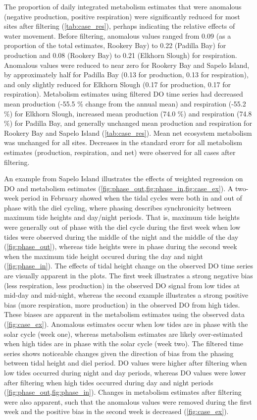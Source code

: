 \documentclass[letterpaper,12pt,oneside]{article}\usepackage[]{graphicx}\usepackage[]{color}
\begin{document}
The proportion of daily integrated metabolism estimates that were anomalous (negative production, positive respiration) were significantly reduced for most sites after filtering (\cref{tab:case_res}), perhaps indicating the relative effects of water movement.  Before filtering, anomalous values ranged from 0.09 (as a proportion of the total estimates, Rookery Bay) to 0.22 (Padilla Bay) for production and 0.08 (Rookery Bay) to 0.21 (Elkhorn Slough) for respiration. Anomalous values were reduced to near zero for Rookery Bay and Sapelo Island, by approximately half for Padilla Bay (0.13 for production, 0.13 for respiration), and only slightly reduced for Elkhorn Slough (0.17 for production, 0.17 for respiration).  Metabolism estimates using filtered \ac{DO} time series had decreased mean production (-55.5 \% change from the annual mean) and respiration (-55.2 \%) for Elkhorn Slough, increased mean production (74.0 \%) and respiration (74.8 \%) for Padilla Bay, and generally unchanged mean production and respiration for Rookery Bay and Sapelo Island (\cref{tab:case_res}).  Mean net ecosystem metabolism was unchanged for all sites.  Decreases in the standard erorr for all metabolism estimates (production, respiration, and net) were observed for all cases after filtering.  

An example from Sapelo Island illustrates the effects of weighted regression on \ac{DO} and metabolism estimates (\cref{fig:phase_out,fig:phase_in,fig:case_ex}).   A two-week period in February showed when the tidal cycles were both in and out of phase with the diel cycling, where phasing describes synchronicity between maximum tide heights and day/night periods.  That is, maximum tide heights were generally out of phase with the diel cycle during the first week when low tides were observed during the middle of the night and the middle of the day (\cref{fig:phase_out}), whereas tide heights were in phase during the second week when the maximum tide height occured during the day and night (\cref{fig:phase_in}).  The effects of tidal height change on the observed \ac{DO} time series are visually apparent in the plots. The first week illustrates a strong negative bias (less respiration, less production) in the observed \ac{DO} signal from low tides at mid-day and mid-night, whereas the second example illustrates a strong positive bias (more respiration, more production) in the observed \ac{DO} from high tides. These biases are apparent in the metabolism estimates using the observed data (\cref{fig:case_ex}).  Anomalous estimates occur when low tides are in phase with the solar cycle (week one), whereas metabolism estimates are likely over-estimated when high tides are in phase with the solar cycle (week two).  The filtered time series shows noticeable changes given the direction of bias from the phasing between tidal height and diel period.  \ac{DO} values were higher after filtering when low tides occurred during night and day periods, whereas \ac{DO} values were lower after filtering when high tides occurred during day and night periods (\cref{fig:phase_out,fig:phase_in}).  Changes in metabolism estimates after filtering were also apparent, such that the anomalous values were removed during the first week and the positive bias in the second week is decreased (\cref{fig:case_ex}).
\end{document}
